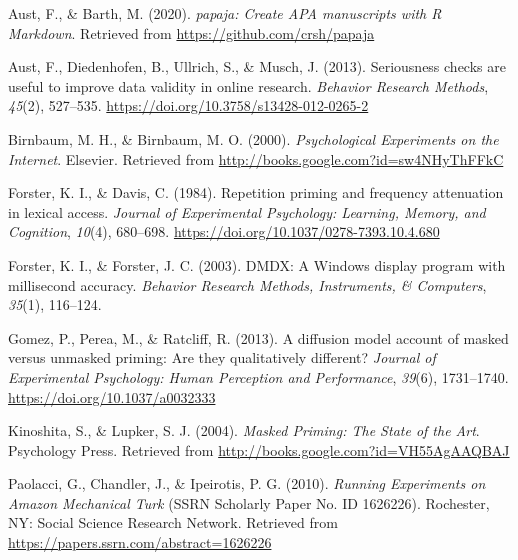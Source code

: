 \documentclass[
  english,
  man]{apa6}
\begin{document}
\begingroup
\setlength{\parindent}{-0.5in}
\setlength{\leftskip}{0.5in}

\hypertarget{refs}{}
\leavevmode\hypertarget{ref-R-papaja}{}%
Aust, F., \& Barth, M. (2020). \emph{papaja: Create APA manuscripts with R Markdown}. Retrieved from \url{https://github.com/crsh/papaja}

\leavevmode\hypertarget{ref-austSeriousnessChecksAre2013}{}%
Aust, F., Diedenhofen, B., Ullrich, S., \& Musch, J. (2013). Seriousness checks are useful to improve data validity in online research. \emph{Behavior Research Methods}, \emph{45}(2), 527--535. \url{https://doi.org/10.3758/s13428-012-0265-2}

\leavevmode\hypertarget{ref-birnbaumPsychologicalExperimentsInternet2000a}{}%
Birnbaum, M. H., \& Birnbaum, M. O. (2000). \emph{Psychological Experiments on the Internet}. Elsevier. Retrieved from \url{http://books.google.com?id=sw4NHyThFFkC}

\leavevmode\hypertarget{ref-forsterRepetitionPrimingFrequency1984}{}%
Forster, K. I., \& Davis, C. (1984). Repetition priming and frequency attenuation in lexical access. \emph{Journal of Experimental Psychology: Learning, Memory, and Cognition}, \emph{10}(4), 680--698. \url{https://doi.org/10.1037/0278-7393.10.4.680}

\leavevmode\hypertarget{ref-forsterDMDXWindowsDisplay2003}{}%
Forster, K. I., \& Forster, J. C. (2003). DMDX: A Windows display program with millisecond accuracy. \emph{Behavior Research Methods, Instruments, \& Computers}, \emph{35}(1), 116--124.

\leavevmode\hypertarget{ref-gomezDiffusionModelAccount2013}{}%
Gomez, P., Perea, M., \& Ratcliff, R. (2013). A diffusion model account of masked versus unmasked priming: Are they qualitatively different? \emph{Journal of Experimental Psychology: Human Perception and Performance}, \emph{39}(6), 1731--1740. \url{https://doi.org/10.1037/a0032333}

\leavevmode\hypertarget{ref-kinoshitaMaskedPrimingState2004}{}%
Kinoshita, S., \& Lupker, S. J. (2004). \emph{Masked Priming: The State of the Art}. Psychology Press. Retrieved from \url{http://books.google.com?id=VH55AgAAQBAJ}

\leavevmode\hypertarget{ref-paolacciRunningExperimentsAmazon2010}{}%
Paolacci, G., Chandler, J., \& Ipeirotis, P. G. (2010). \emph{Running Experiments on Amazon Mechanical Turk} (SSRN Scholarly Paper No. ID 1626226). Rochester, NY: Social Science Research Network. Retrieved from \url{https://papers.ssrn.com/abstract=1626226}
\end{document}
